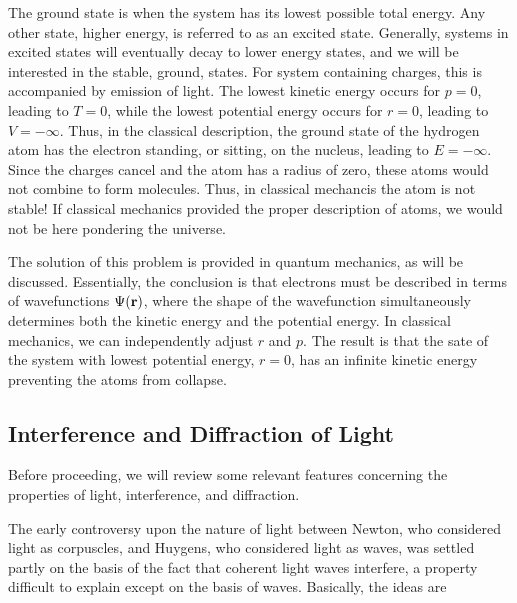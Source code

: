 The ground state is when the system has its lowest possible total energy.
Any other state, higher energy, is referred to as an excited state.  Generally, 
systems in excited states will eventually decay to lower energy states, and
we will be interested in the stable, ground, states.  For system containing 
charges, this is accompanied by emission of light. The lowest kinetic energy 
occurs for $p = 0$, leading to $T = 0$, while the lowest potential energy 
occurs for $r = 0$, leading to $V = -\infty$. Thus, in the
classical description, the ground state of the hydrogen atom has the 
electron standing, or sitting, on the nucleus, leading to $E = 
- \infty$. Since the charges cancel and the atom has a
radius of zero, these atoms would not combine to form molecules. Thus, in
classical mechancis the atom is not stable!  If classical mechanics 
provided the proper description of atoms, we would not be here pondering 
the  universe.

The solution of this problem is provided in quantum mechanics, as will be 
discussed.  Essentially, the conclusion is that electrons must be described 
in terms of wavefunctions $\Psi({\bf r})$, where the shape of the 
wavefunction simultaneously determines both the kinetic energy and the 
potential energy.  In classical mechanics, we can independently adjust $r$ 
and $p$.  The result is that the sate of the system with lowest potential 
energy, $r=0$, has an infinite kinetic energy preventing the atoms from 
collapse.

\subsection{Interference and Diffraction of Light}

Before proceeding, we will review some relevant features concerning the 
properties of light, interference, and diffraction.

The early controversy upon the nature of light between Newton, who 
considered light as corpuscles, and Huygens, who considered light as waves,
was settled partly on the basis of the fact that coherent light waves 
interfere, a property difficult to explain except on the basis of waves.  
Basically, the ideas are

